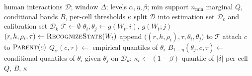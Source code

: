 \begin{algorithm}[t]
\caption{Offline calibration of dynamic and conditional envelopes}
\label{alg:calib}
\begin{algorithmic}[1]
\REQUIRE human interactions $\mathcal{D}$; window $\Delta$; levels $\alpha,\eta,\beta$;
         min support $n_{\min}$
\ENSURE marginal $Q$, conditional bands $B$, per-cell thresholds $\kappa$
\STATE split $\mathcal{D}$ into estimation set $\mathcal{D}_e$ and calibration set $\mathcal{D}_k$
\STATE $\mathcal{T}\leftarrow\emptyset$
    \STATE $\theta_i,\theta_j\leftarrow g(W_t;i),\,g(W_t;j)$ 
    \STATE $(r,h,\rho_i,\tau)\leftarrow \textsc{RecognizeState}(W_t)$
    \STATE append $\bigl((r,h,\rho_i),\tau,\theta_i,\theta_j\bigr)$ to $\mathcal{T}$
\ENDFOR
{}
        \STATE attach $c$ to $\textsc{Parent}(c)$ 
    \ENDIF
    \STATE $Q_\alpha(c,\tau)\leftarrow$ empirical quantiles of $\theta_i$
    \STATE $B_{1-\eta}(\theta_j,c,\tau)\leftarrow$ conditional quantiles of $\theta_i$ given $\theta_j$
\ENDFOR
\STATE on $\mathcal{D}_k$: $\kappa_c\leftarrow (1-\beta)$ quantile of $|\delta|$ per cell 
\RETURN $Q,\,B,\,\kappa$
\end{algorithmic}
\end{algorithm}

